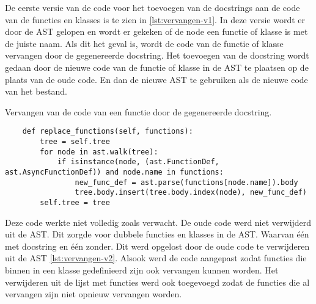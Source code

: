 De eerste versie van de code voor het toevoegen van de docstrings aan de code van de functies en klasses is te zien in \ref{lst:vervangen-v1}.
In deze versie wordt er door de AST gelopen en wordt er gekeken of de node een functie of klasse is met de juiste naam. 
Als dit het geval is, wordt de code van de functie of klasse vervangen door de gegenereerde docstring.
Het toevoegen van de docstring wordt gedaan door de nieuwe code van de functie of klasse in de AST te plaatsen op de plaats van de oude code.
En dan de nieuwe AST te gebruiken als de nieuwe code van het bestand.

\begin{listing}
    \caption{Vervangen van de code van een functie door de gegenereerde docstring.}
    \label{lst:vervangen-v1}
    \begin{verbatim}
    def replace_functions(self, functions):
        tree = self.tree
        for node in ast.walk(tree):
            if isinstance(node, (ast.FunctionDef, ast.AsyncFunctionDef)) and node.name in functions:
                new_func_def = ast.parse(functions[node.name]).body
                tree.body.insert(tree.body.index(node), new_func_def)        
        self.tree = tree

    \end{verbatim}
\end{listing}

Deze code werkte niet volledig zoals verwacht. De oude code werd niet verwijderd uit de AST. Dit zorgde voor dubbele functies en klasses in de AST.
Waarvan één met docstring en één zonder. Dit werd opgelost door de oude code te verwijderen uit de AST \ref{lst:vervangen-v2}.
Alsook werd de code aangepast zodat functies die binnen in een klasse gedefinieerd zijn ook vervangen kunnen worden.
Het verwijderen uit de lijst met functies werd ook toegevoegd zodat de functies die al vervangen zijn niet opnieuw vervangen worden.


